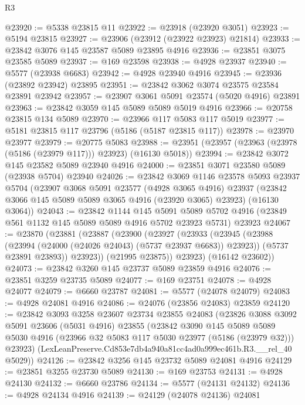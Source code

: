 \begin{lexlean}{R3}
\begin{coremodule}
@23920 := @5338 @23815 @11
@23922 := @23918 (@23920 @3051)
@23923 := @5194 @23815
@23927 := @23906 (@23912 (@23922 @23923) @21814)
@23933 := @23842 @3076 @145 @23587 @5089 @23895 @4916
@23936 := @23851 @3075 @23585 @5089
@23937 := @169 @23598
@23938 := @4928 @23937
@23940 := @5577 (@23938 @6683)
@23942 := @4928 @23940 @4916
@23945 := @23936 (@23892 @23942) @23895
@23951 := @23842 @3062 @3074 @23575 @23584 @23891 @23942
@23957 := @23907 @3061 @5091 @23574 (@5020 @4916) @23891
@23963 := @23842 @3059 @145 @5089 @5089 @5019 @4916
@23966 := @20758 @23815 @134 @5089
@23970 := @23966 @117 @5083 @117 @5019
@23977 := @5181 @23815 @117 @23796 (@5186 (@5187 @23815 @117))
@23978 := @23970 @23977
@23979 := @20775 @5083
@23988 := @23951 (@23957 (@23963 (@23978 (@5186 (@23979 @117))) @23923) (@16130 @5018))
@23994 := @23842 @3072 @145 @23582 @5089 @23940 @4916
@24000 := @23851 @3071 @23580 @5089 (@23938 @5704) @23940
@24026 := @23842
    @3069
    @1146
    @23578
    @5093
    @23937
    @5704
    (@23907
      @3068
      @5091
      @23577
      (@4928 @3065 @4916)
      @23937
      (@23842 @3066 @145 @5089 @5089 @3065 @4916 (@23920 @3065) @23923)
      (@16130 @3064))
@24043 := @23842
    @1144
    @145
    @5091
    @5089
    @5702
    @4916
    (@23849 @561 @1132 @145 @5089 @5089 @4916 @5702 @23923 @5731)
    @23923
@24067 := @23870
    (@23881
      (@23887
        (@23900
          (@23927
            (@23933
              (@23945
                (@23988 (@23994 (@24000 (@24026 @24043) (@5737 @23937 @6683)) @23923))
                (@5737 @23891 @23893))
              @23923))
          (@21995 @23875))
        @23923)
      (@16142 @23602))
@24073 := @23842 @3260 @145 @23737 @5089 @23859 @4916
@24076 := @23851 @3259 @23735 @5089
@24077 := @169 @23751
@24078 := @4928 @24077
@24079 := @6660 @23787
@24081 := @5577 (@24078 @24079)
@24083 := @4928 @24081 @4916
@24086 := @24076 (@23856 @24083) @23859
@24120 := @23842
    @3093
    @3258
    @23607
    @23734
    @23855
    @24083
    (@23826
      @3088
      @3092
      @5091
      @23606
      (@5031 @4916)
      @23855
      (@23842
        @3090
        @145
        @5089
        @5089
        @5030
        @4916
        (@23966 @32 @5083 @117 @5030 @23977 (@5186 (@23979 @32)))
        @23923)
      (LexLeanPreserve.Cd853e7db4a940a81cc4ad0a999ec461b.R3.__rel_40 @5029))
@24126 := @23842 @3256 @145 @23732 @5089 @24081 @4916
@24129 := @23851 @3255 @23730 @5089
@24130 := @169 @23753
@24131 := @4928 @24130
@24132 := @6660 @23786
@24134 := @5577 (@24131 @24132)
@24136 := @4928 @24134 @4916
@24139 := @24129 (@24078 @24136) @24081

\end{coremodule}
\end{lexlean}
